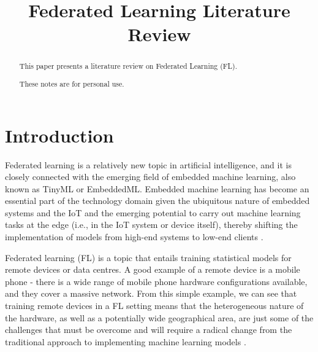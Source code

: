 \documentclass[conference]{IEEEtran}
\begin{document}
\title{Federated Learning Literature Review}


\author{
}

\maketitle

\begin{abstract}
This paper presents a literature review on Federated Learning (FL).

\noindent These notes are for personal use.
\end{abstract}

\begin{IEEEkeywords}

\end{IEEEkeywords}

\section{Introduction}
Federated learning is a relatively new topic in artificial intelligence, and it is closely connected with the emerging field of embedded machine learning, also known as TinyML or EmbeddedML. Embedded machine learning has become an essential part of the technology domain given the ubiquitous nature of embedded systems and the IoT and the emerging potential to carry out machine learning tasks at the edge (i.e., in the IoT system or device itself), thereby shifting the implementation of models from high-end systems to low-end clients \cite{b1}.

Federated learning (FL) is a topic that entails training statistical models for remote devices or data centres. A good example of a remote device is a mobile phone - there is a wide range of mobile phone hardware configurations available, and they cover a massive network. From this simple example, we can see that training remote devices in a FL setting means that the heterogeneous nature of the hardware, as well as a potentially wide geographical area, are just some of the challenges that must be overcome and will require a radical change from the traditional approach to implementing machine learning models \cite{b2}.
\end{document}
